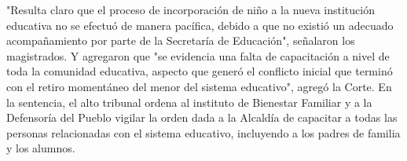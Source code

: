 \documentclass[10pt,twoside]{article}
\begin{document}
"Resulta claro que el proceso de incorporación de niño a la nueva institución
educativa no se efectuó de manera pacífica, debido a que no existió un adecuado acompañamiento por parte de la Secretaría de Educación", señalaron los magistrados. Y agregaron que "se evidencia una falta de capacitación a nivel de toda la comunidad educativa, aspecto que generó el conflicto inicial que terminó con el retiro momentáneo del menor del sistema educativo", agregó la Corte. En la sentencia, el alto tribunal ordena al instituto de Bienestar Familiar y a la Defensoría del Pueblo vigilar la orden dada a la Alcaldía de capacitar a todas las personas relacionadas con el sistema educativo, incluyendo a los padres de familia y los alumnos.
\end{document}
